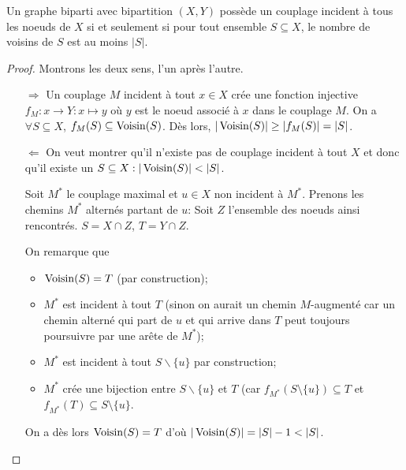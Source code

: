 \begin{mytheo} 
  Un graphe biparti avec bipartition $(X , Y)$ possède un couplage incident à tous les noeuds de $X$
  si et seulement si pour tout ensemble $S \subseteq X$, le nombre de voisins de $S$ est au moins $|S|$.
  \begin{proof}
    Montrons les deux sens, l'un après l'autre.
    \begin{itemize}
      \item[$\Longrightarrow$]
        Un couplage $M$ incident à tout $x \in X$ crée une fonction injective
        $f_M : x \to Y: x \mapsto y$ où $y$ est le noeud associé à $x$ dans le couplage $M$.
        On a $\forall S \subseteq X$, $f_M(S) \subseteq \operatorname{Voisin}(S)$.
        Dès lors, $|\operatorname{Voisin}(S)| \geq |f_M(S)| = |S|$.
      \item[$\Longleftarrow$]
        On veut montrer qu'il n'existe pas de couplage incident à tout $X$
        et donc qu'il existe un $S \subseteq X : |\operatorname{Voisin}(S)| < |S|$.

        Soit $M^*$ le couplage maximal et $u \in X$ non incident à $M^*$.
        Prenons les chemins $M^*$ alternés partant de $u$:
        Soit $Z$ l'ensemble des noeuds ainsi rencontrés.
        $S = X \cap Z$, $T = Y \cap Z$.

        On remarque que
        \begin{itemize}
          \item $\operatorname{Voisin}(S) = T$ (par construction);
          \item	$M^*$ est incident à tout $T$ (sinon on aurait un chemin $M$-augmenté car un chemin alterné qui part de $u$ et qui arrive dans $T$ peut toujours poursuivre par une arête de $M^*$);
          \item $M^*$ est incident à tout $S\backslash\lbrace u\rbrace$ par construction;
          \item $M^*$ crée une bijection entre $S\backslash\lbrace u\rbrace$ et $T$
            (car $f_{M^*} (S\setminus \lbrace u\rbrace) \subseteq T$ et
            $f_{M^*}(T) \subseteq S\setminus\lbrace u\rbrace$.
        \end{itemize}
        On a dès lors $\operatorname{Voisin}(S) = T$ d'où $|\operatorname{Voisin}(S)| = |S| - 1 < |S|$.


\end{itemize}
\end{proof}
\end{mytheo}

